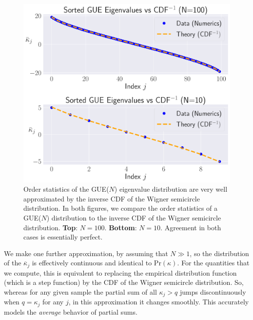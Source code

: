 \documentclass[aps,pra, twocolumn]{revtex4-1}
\begin{document}
\begin{figure}[t]
\includegraphics[width=\columnwidth]{Images/Figure_8.pdf}
\caption{Order statistics of the GUE($N$) eigenvalue distribution are very well approximated by the inverse CDF of the Wigner semicircle distribution.  In both figures, we compare the order statistics of a GUE($N$) distribution to the inverse CDF of the Wigner semicircle distribution. \textbf{Top}:  $N=100$.  \textbf{Bottom}:  $N=10$.
Agreement in both cases is essentially perfect.}
\label{fig:orderstatistics2}
\end{figure}

We make one further approximation, by assuming that $N\gg1$, so the distribution of the $\overline{\kappa}_j$ is effectively continuous and identical to $\mathrm{Pr}(\kappa)$. For the quantities that we compute, this is equivalent to replacing the empirical distribution function (which is a step function) by the CDF of the Wigner semicircle distribution.  So, whereas for any given sample the partial sum of all $\kappa_j > q$ jumps discontinuously when $q=\kappa_j$ for any $j$, in this approximation it changes smoothly.  This accurately models the \emph{average} behavior of partial sums.
\end{document}
